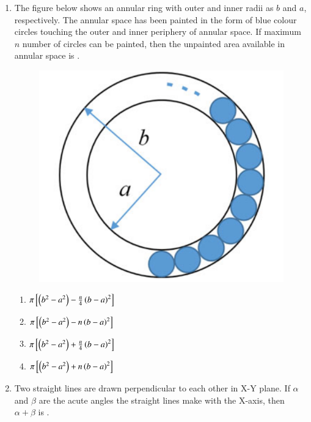 \documentclass[journal,12pt,onecolumn]{IEEEtran}
\theoremstyle{remark}
\begin{document}
\begin{enumerate}
		\item The figure below shows an annular ring with outer and inner radii as $b$ and $a$, respectively. The annular space has been painted in the form of blue colour circles touching the outer and inner periphery of annular space. If maximum $n$ number of circles can be painted, then the unpainted area available in annular space is \underline{\hspace{2cm}}.
		\begin{figure}[H]
			\centering
			\includegraphics[width=0.45\linewidth]{figs/2}
			\caption{}
			\label{fig:2}
		\end{figure}
		
		
		\hfill{}
		\begin{enumerate}
			\item $\pi \left[ \left(b^2-a^2\right) - \frac{n}{4}\left(b-a\right)^2 \right]$
			\item $\pi \left[ \left(b^2-a^2\right) - n\left(b-a\right)^2 \right]$
			\item $\pi \left[ \left(b^2-a^2\right) + \frac{n}{4}\left(b-a\right)^2 \right]$
			\item $\pi \left[ \left(b^2-a^2\right) + n\left(b-a\right)^2 \right]$
		\end{enumerate}
		
		\item Two straight lines are drawn perpendicular to each other in X-Y plane. If $\alpha$ and $\beta$ are the acute angles the straight lines make with the X-axis, then $\alpha + \beta$ is \underline{\hspace{2cm}}.
		
		\hfill{}
		\begin{enumerate}
		\end{enumerate}
		

\end{enumerate}
\end{document}
